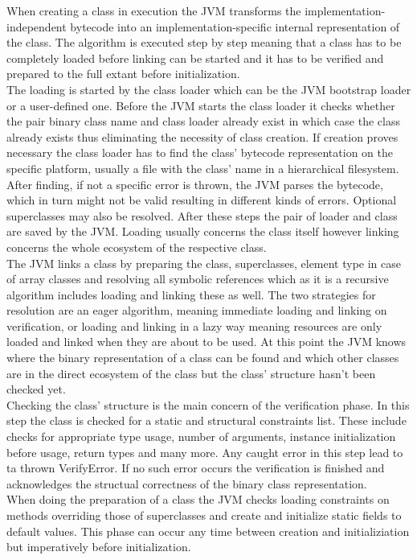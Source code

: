 When creating a class in execution the JVM transforms the implementation-independent bytecode into an implementation-specific internal representation of the class. The algorithm is executed step by step meaning that a class has to be completely loaded before linking can be started and it has to be verified and prepared to the full extant before initialization.\\
The loading is started by the class loader which can be the JVM bootstrap loader or a user-defined one. Before the JVM starts the class loader it checks whether the pair binary class name and class loader already exist in which case the class already exists thus eliminating the necessity of class creation. If creation proves necessary the class loader has to find the class' bytecode representation on the specific platform, usually a file with the class' name in a hierarchical filesystem. After finding, if not a specific error is thrown, the JVM parses the bytecode, which in turn might not be valid resulting in different kinds of errors. Optional superclasses may also be resolved. After these steps the pair of loader and class are saved by the JVM. Loading usually concerns the class itself however linking concerns the whole ecosystem of the respective class. \\
The JVM links a class by preparing the class, superclasses, element type in case of array classes and resolving all symbolic references which as it is a recursive algorithm includes loading and linking these as well. The two strategies for resolution are an eager algorithm, meaning immediate loading and linking on verification, or loading and linking in a lazy way meaning resources are only loaded and linked when they are about to be used. At this point the JVM knows where the binary representation of a class can be found and which other classes are in the direct ecosystem of the class but the class' structure hasn't been checked yet.\\
Checking the class' structure is the main concern of the verification phase. In this step the class is checked for a static and structural constraints list. These include checks for appropriate type usage, number of arguments, instance initialization before usage, return types and many more. Any caught error in this step lead to ta thrown VerifyError. If no such error occurs the verification is finished and acknowledges the structual correctness of the binary class representation.\\
When doing the preparation of a class the JVM checks loading constraints on methods overriding those of superclasses and create and initialize static fields to default values. This phase can occur any time between creation and initializiation but imperatively before initialization.\\
